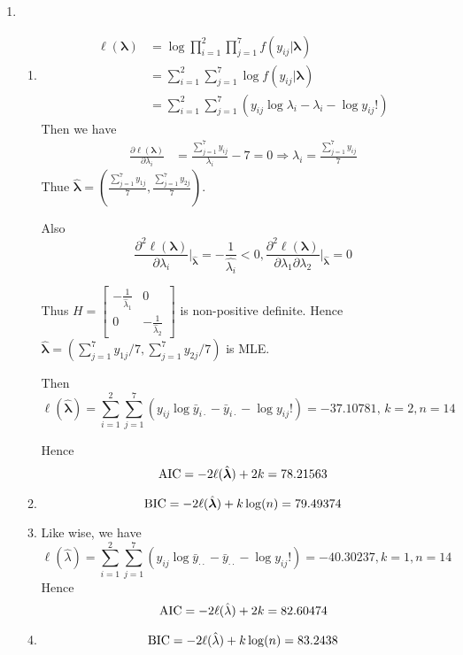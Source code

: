 \documentclass{article}
\begin{document}
\begin{enumerate}[leftmargin = 0 em, label = \arabic*., font = \bfseries]
	\item 
	\begin{enumerate}
		\item 
		\begin{align*}
		 \ell (\bm \lambda) & = \log \prod_{i=1}^2 \prod_{j=1}^7 f(y_{ij} | \bm \lambda)\\
		 & = \sum_{i=1}^2 \sum_{j=1}^7 \log f(y_{ij}| \bm \lambda)\\
		 & = \sum_{i=1}^2 \sum_{j=1}^7\left(y_{ij} \log \lambda_i - \lambda_i - \log y_{ij}!\right)
		 \end{align*}
		 Then we have
		 \begin{align*}
		 \frac{\partial \ell (\bm \lambda)}{\partial \lambda_i} &= \frac{\sum_{j=1}^7 y_{ij}}{\lambda_i} - 7 = 0 \Rightarrow \lambda_i = \frac{\sum_{j=1}^7 y_{ij}}{7}  
		 \end{align*}
		 Thue $\hat{\bm \lambda} = \left(\frac{\sum_{j=1}^7 y_{1j}}{7}, \frac{\sum_{j=1}^7 y_{2j}}{7}\right)$.
		 
		 Also
		 \[\frac{\partial^2 \ell (\bm \lambda)}{\partial \lambda_i} \bigg|_{\hat{\bm \lambda}}= - \frac{1}{\hat{\lambda_i}} < 0, \frac{\partial^2 \ell (\bm \lambda)}{\partial \lambda_1 \partial \lambda_2} \bigg|_{\hat{\bm \lambda}}= 0\]

		 Thus $H = \begin{bmatrix}
		 	- \frac{1}{\hat{\lambda}_1} & 0 \\
		 	0 & -\frac{1}{\hat{\lambda}_2}
		 \end{bmatrix}$ is non-positive definite. Hence $\hat{\bm \lambda} = \left( \sum_{j=1}^7 y_{1j}/7, \sum_{j=1}^7 y_{2j}/7\right)$ is MLE.

		 Then
		 \[\ell (\hat{\bm \lambda}) = \sum_{i=1}^2 \sum_{j=1}^7 \left( y_{ij} \log \bar{y}_{i \cdot} - \bar{y}_{i \cdot} - \log y_{ij}!\right) = -37.10781,\, k = 2, n = 14\]

		 Hence 
		 \[{\rm AIC} = -2 \ell(\hat{\bm \lambda}) + 2k = 78.21563\]

		 \item 
		 \[{\rm BIC} = -2 \ell(\hat{\bm \lambda}) +  k \log(n) = 79.49374\]

		 \item 
		 Like wise, we have
		 \[\ell (\hat{\lambda}) = \sum_{i=1}^2 \sum_{j=1}^7 \left( y_{ij} \log \bar{y}_{\cdot \cdot} - \bar{y}_{\cdot \cdot} - \log y_{ij}! \right) = -40.30237, k = 1, n = 14\]
		 Hence
		 \[{\rm AIC} = -2 \ell(\hat{\lambda}) + 2k  = 82.60474\]

		 \item 
		 \[{\rm BIC} = -2 \ell(\hat{\lambda}) + k \log (n) = 83.2438\]


\end{enumerate}
\end{enumerate}
\end{document}
